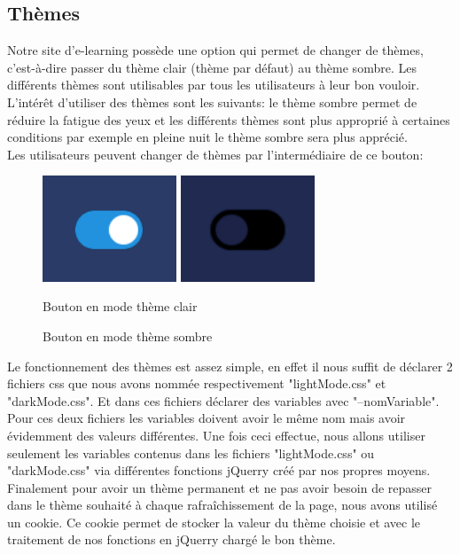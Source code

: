 \documentclass[a4paper,11pt]{article}
\begin{document}
\subsection{Thèmes}
Notre site d'e-learning possède une option qui permet de changer de thèmes, c'est-à-dire passer du thème clair (thème par défaut) au thème sombre. Les différents thèmes sont utilisables par tous les utilisateurs à leur bon vouloir. L'intérêt d'utiliser des thèmes sont les suivants: le thème sombre permet de réduire la fatigue des yeux et les différents thèmes sont plus approprié à certaines conditions par exemple en pleine nuit le thème sombre sera plus apprécié.\\

Les utilisateurs peuvent changer de thèmes par l'intermédiaire de ce bouton:
\begin{figure}[!h]
\centerline{
    \includegraphics[width=4cm]{images/boutonThemeClaire.PNG}
    \includegraphics[width=4cm]{images/boutonThemeSombre.PNG}
}
\caption{Bouton en mode thème clair}
\caption{Bouton en mode thème sombre}
\label{fig}
\end{figure}

Le fonctionnement des thèmes est assez simple, en effet il nous suffit de déclarer 2 fichiers css que nous avons nommée respectivement "lightMode.css" et "darkMode.css". Et dans ces fichiers déclarer des variables avec "--nomVariable". Pour ces deux fichiers les variables doivent avoir le même nom mais avoir évidemment des valeurs différentes. Une fois ceci effectue, nous allons utiliser seulement les variables contenus dans les fichiers "lightMode.css" ou "darkMode.css" via différentes fonctions jQuerry créé par nos propres moyens. Finalement pour avoir un thème permanent et ne pas avoir besoin de repasser dans le thème souhaité à chaque rafraîchissement de la page, nous avons utilisé un cookie. Ce cookie permet de stocker la valeur du thème choisie et avec le traitement de nos fonctions en jQuerry chargé le bon thème.
\end{document}
